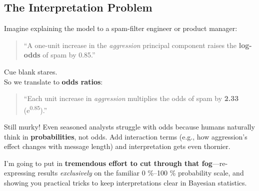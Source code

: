 \documentclass[
  letterpaper,
  DIV=11,
  numbers=noendperiod]{scrartcl}
\begin{document}
\subsection{The Interpretation
Problem}\label{the-interpretation-problem}

Imagine explaining the model to a spam-filter engineer or product
manager:

\begin{quote}
``A one-unit increase in the \emph{aggression} principal component
raises the \textbf{log-odds} of spam by 0.85.''
\end{quote}

Cue blank stares.\\
So we translate to \textbf{odds ratios}:

\begin{quote}
``Each unit increase in \emph{aggression} multiplies the odds of spam by
\textbf{2.33} (e\textsuperscript{0.85}).''
\end{quote}

Still murky! Even seasoned analysts struggle with odds because humans
naturally think in \textbf{probabilities}, not odds. Add interaction
terms (e.g., how aggression's effect changes with message length) and
interpretation gets even thornier.

I'm going to put in \textbf{tremendous effort to cut through that
fog}---re-expressing results \emph{exclusively} on the familiar 0
\%--100 \% probability scale, and showing you practical tricks to keep
interpretations clear in Bayesian statistics.
\end{document}
